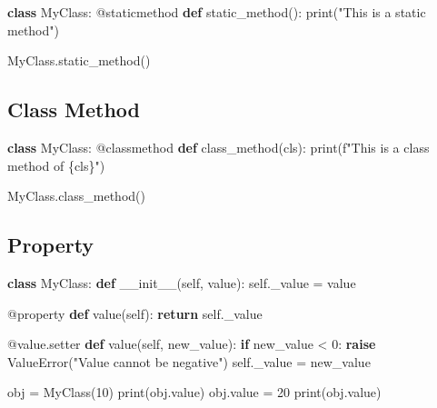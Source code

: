 \documentclass[
  letterpaper,
  DIV=11,
  numbers=noendperiod]{scrreprt}
\newenvironment{Shaded}{\begin{snugshade}}{\end{snugshade}}
\newcommand{\AttributeTok}[1]{\textcolor[rgb]{0.40,0.45,0.13}{#1}}
\newcommand{\BuiltInTok}[1]{\textcolor[rgb]{0.00,0.23,0.31}{#1}}
\newcommand{\ControlFlowTok}[1]{\textcolor[rgb]{0.00,0.23,0.31}{\textbf{#1}}}
\newcommand{\DecValTok}[1]{\textcolor[rgb]{0.68,0.00,0.00}{#1}}
\newcommand{\FunctionTok}[1]{\textcolor[rgb]{0.28,0.35,0.67}{#1}}
\newcommand{\KeywordTok}[1]{\textcolor[rgb]{0.00,0.23,0.31}{\textbf{#1}}}
\newcommand{\NormalTok}[1]{\textcolor[rgb]{0.00,0.23,0.31}{#1}}
\newcommand{\OperatorTok}[1]{\textcolor[rgb]{0.37,0.37,0.37}{#1}}
\newcommand{\PreprocessorTok}[1]{\textcolor[rgb]{0.68,0.00,0.00}{#1}}
\newcommand{\SpecialCharTok}[1]{\textcolor[rgb]{0.37,0.37,0.37}{#1}}
\newcommand{\SpecialStringTok}[1]{\textcolor[rgb]{0.13,0.47,0.30}{#1}}
\newcommand{\StringTok}[1]{\textcolor[rgb]{0.13,0.47,0.30}{#1}}
\newcommand{\VariableTok}[1]{\textcolor[rgb]{0.07,0.07,0.07}{#1}}
\begin{document}
\begin{Shaded}
\begin{Highlighting}[]
\KeywordTok{class}\NormalTok{ MyClass:}
    \AttributeTok{@staticmethod}
    \KeywordTok{def}\NormalTok{ static\_method():}
        \BuiltInTok{print}\NormalTok{(}\StringTok{"This is a static method"}\NormalTok{)}

\NormalTok{MyClass.static\_method()}
\end{Highlighting}
\end{Shaded}

\subsection{Class Method}\label{class-method}

\begin{Shaded}
\begin{Highlighting}[]
\KeywordTok{class}\NormalTok{ MyClass:}
    \AttributeTok{@classmethod}
    \KeywordTok{def}\NormalTok{ class\_method(cls):}
        \BuiltInTok{print}\NormalTok{(}\SpecialStringTok{f"This is a class method of }\SpecialCharTok{\{}\NormalTok{cls}\SpecialCharTok{\}}\SpecialStringTok{"}\NormalTok{)}

\NormalTok{MyClass.class\_method()}
\end{Highlighting}
\end{Shaded}

\subsection{Property}\label{property}

\begin{Shaded}
\begin{Highlighting}[]
\KeywordTok{class}\NormalTok{ MyClass:}
    \KeywordTok{def} \FunctionTok{\_\_init\_\_}\NormalTok{(}\VariableTok{self}\NormalTok{, value):}
        \VariableTok{self}\NormalTok{.\_value }\OperatorTok{=}\NormalTok{ value}

    \AttributeTok{@property}
    \KeywordTok{def}\NormalTok{ value(}\VariableTok{self}\NormalTok{):}
        \ControlFlowTok{return} \VariableTok{self}\NormalTok{.\_value}

    \AttributeTok{@value.setter}
    \KeywordTok{def}\NormalTok{ value(}\VariableTok{self}\NormalTok{, new\_value):}
        \ControlFlowTok{if}\NormalTok{ new\_value }\OperatorTok{\textless{}} \DecValTok{0}\NormalTok{:}
            \ControlFlowTok{raise} \PreprocessorTok{ValueError}\NormalTok{(}\StringTok{"Value cannot be negative"}\NormalTok{)}
        \VariableTok{self}\NormalTok{.\_value }\OperatorTok{=}\NormalTok{ new\_value}

\NormalTok{obj }\OperatorTok{=}\NormalTok{ MyClass(}\DecValTok{10}\NormalTok{)}
\BuiltInTok{print}\NormalTok{(obj.value)}
\NormalTok{obj.value }\OperatorTok{=} \DecValTok{20}
\BuiltInTok{print}\NormalTok{(obj.value)}
\end{Highlighting}
\end{Shaded}
\end{document}
